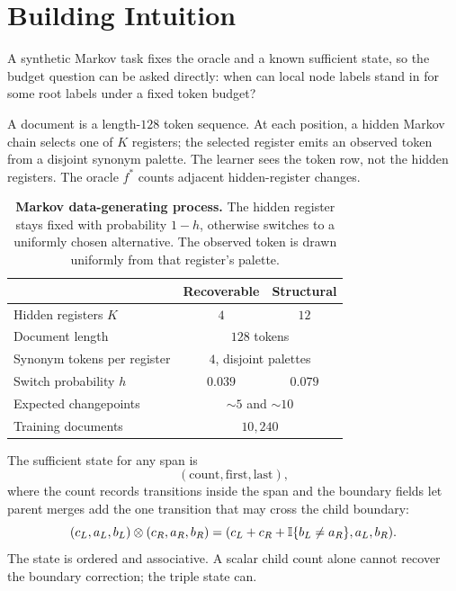 \section{Building Intuition}
\label{sec:v10-controlled-checks}
\label{sec:v10-markov-check}

A synthetic Markov task fixes the oracle and a known sufficient
state, so the budget question can be asked directly: when can
local node labels stand in for some root labels under a fixed
token budget?

A document is a length-\(128\) token sequence. At each position, a
hidden Markov chain selects one of \(K\) registers; the selected
register emits an observed token from a disjoint synonym palette.
The learner sees the token row, not the hidden registers. The
oracle \(f^\ast\) counts adjacent hidden-register changes.

\begin{table}[t]
\centering
\small
\begin{tabular}{@{}lcc@{}}
\toprule
 & Recoverable & Structural \\
\midrule
Hidden registers \(K\) & \(4\) & \(12\) \\
Document length & \multicolumn{2}{c}{\(128\) tokens} \\
Synonym tokens per register & \multicolumn{2}{c}{\(4\), disjoint palettes} \\
Switch probability \(h\) & \(0.039\) & \(0.079\) \\
Expected changepoints & \multicolumn{2}{c}{\({\sim}5\) and \({\sim}10\)} \\
Training documents & \multicolumn{2}{c}{\(10{,}240\)} \\
\bottomrule
\end{tabular}
\caption{\textbf{Markov data-generating process.} The hidden register
stays fixed with probability \(1-h\), otherwise switches to a uniformly
chosen alternative. The observed token is drawn uniformly from that
register's palette.}
\label{tab:v10-markov-dgp}
\end{table}

The sufficient state for any span is
\[
  (\mathrm{count},\mathrm{first},\mathrm{last}),
\]
where the count records transitions inside the span and the boundary
fields let parent merges add the one transition that may cross the
child boundary:
\[
(c_L,a_L,b_L)\otimes(c_R,a_R,b_R)
=
(c_L+c_R+\mathbb{I}\{b_L\ne a_R\},a_L,b_R).
\]
The state is ordered and associative. A scalar child count alone
cannot recover the boundary correction; the triple state can.

